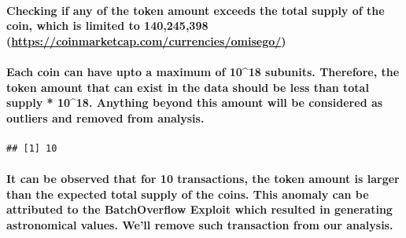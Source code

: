 \documentclass[]{article}
\newenvironment{Shaded}{\begin{snugshade}}{\end{snugshade}}
\newcommand{\KeywordTok}[1]{\textcolor[rgb]{0.13,0.29,0.53}{\textbf{#1}}}
\newcommand{\DecValTok}[1]{\textcolor[rgb]{0.00,0.00,0.81}{#1}}
\newcommand{\StringTok}[1]{\textcolor[rgb]{0.31,0.60,0.02}{#1}}
\newcommand{\OperatorTok}[1]{\textcolor[rgb]{0.81,0.36,0.00}{\textbf{#1}}}
\newcommand{\NormalTok}[1]{#1}
\let\oldparagraph\paragraph
\renewcommand{\paragraph}[1]{\oldparagraph{#1}\mbox{}}
\begin{document}
\paragraph{\texorpdfstring{Checking if any of the token amount exceeds
the total supply of the coin, which is limited to 140,245,398
(\url{https://coinmarketcap.com/currencies/omisego/})}{Checking if any of the token amount exceeds the total supply of the coin, which is limited to 140,245,398 (https://coinmarketcap.com/currencies/omisego/)}}\label{checking-if-any-of-the-token-amount-exceeds-the-total-supply-of-the-coin-which-is-limited-to-140245398-httpscoinmarketcap.comcurrenciesomisego}

\paragraph{Each coin can have upto a maximum of 10\^{}18 subunits.
Therefore, the token amount that can exist in the data should be less
than total supply * 10\^{}18. Anything beyond this amount will be
considered as outliers and removed from
analysis.}\label{each-coin-can-have-upto-a-maximum-of-1018-subunits.-therefore-the-token-amount-that-can-exist-in-the-data-should-be-less-than-total-supply-1018.-anything-beyond-this-amount-will-be-considered-as-outliers-and-removed-from-analysis.-2}

\begin{Shaded}
\end{Shaded}

\begin{verbatim}
## [1] 10
\end{verbatim}

\paragraph{It can be observed that for 10 transactions, the token amount
is larger than the expected total supply of the coins. This anomaly can
be attributed to the BatchOverflow Exploit which resulted in generating
astronomical values. We'll remove such transaction from our
analysis.}\label{it-can-be-observed-that-for-10-transactions-the-token-amount-is-larger-than-the-expected-total-supply-of-the-coins.-this-anomaly-can-be-attributed-to-the-batchoverflow-exploit-which-resulted-in-generating-astronomical-values.-well-remove-such-transaction-from-our-analysis.}
\end{document}
